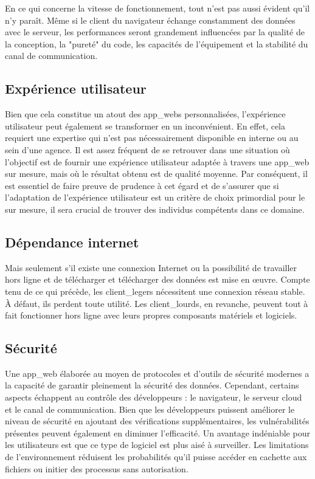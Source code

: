 \documentclass[a4paper, 12pt, french]{article}
\begin{document}
				En ce qui concerne la vitesse de fonctionnement, tout n'est pas aussi évident qu'il n'y paraît. Même si le client du navigateur échange constamment des données avec le serveur, les performances seront grandement influencées par la qualité de la conception, la "pureté" du code, les capacités de l'équipement et la stabilité du canal de communication.

			\subsection{Expérience utilisateur}
				Bien que cela constitue un atout des \glspl{app_web} personnalisées, l'expérience utilisateur peut également se transformer en un inconvénient. En effet, cela requiert une expertise qui n'est pas nécessairement disponible en interne ou au sein d'une agence. Il est assez fréquent de se retrouver dans une situation où l'objectif est de fournir une expérience utilisateur adaptée à travers une \gls{app_web} sur mesure, mais où le résultat obtenu est de qualité moyenne. Par conséquent, il est essentiel de faire preuve de prudence à cet égard et de s'assurer que si l'adaptation de l'expérience utilisateur est un critère de choix primordial pour le sur mesure, il sera crucial de trouver des individus compétents dans ce domaine.
			
			\subsection{Dépendance internet}
				Mais seulement s'il existe une connexion Internet ou la possibilité de travailler hors ligne et de télécharger et télécharger des données est mise en œuvre. Compte tenu de ce qui précède, les \glspl{client_leger} nécessitent une connexion réseau stable. À défaut, ils perdent toute utilité. Les \glspl{client_lourd}, en revanche, peuvent tout à fait fonctionner hors ligne avec leurs propres composants matériels et logiciels.
			
			\subsection{Sécurité}
				Une \gls{app_web} élaborée au moyen de protocoles et d'outils de sécurité modernes a la capacité de garantir pleinement la sécurité des données. Cependant, certains aspects échappent au contrôle des développeurs : le navigateur, le serveur cloud et le canal de communication. Bien que les développeurs puissent améliorer le niveau de sécurité en ajoutant des vérifications supplémentaires, les vulnérabilités présentes peuvent également en diminuer l'efficacité. Un avantage indéniable pour les utilisateurs est que ce type de logiciel est plus aisé à surveiller. Les limitations de l'environnement réduisent les probabilités qu'il puisse accéder en cachette aux fichiers ou initier des processus sans autorisation.
			
\end{document}
